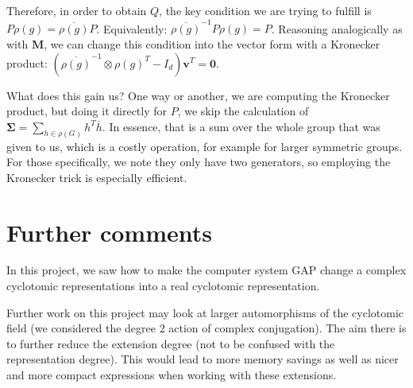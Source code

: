 \documentclass[11pt]{article}
\begin{document}
Therefore, in order to obtain $Q$, the key condition we are trying to
fulfill is $P\rho(g) = \overline{\rho(g)}P$. Equivalently:
$\overline{\rho(g)}^{-1}P\rho(g) = P$. Reasoning analogically as with $\mathbf{M}$,
we can change this condition into the vector form with a Kronecker product:
$\left(\overline{\rho(g)}^{-1} \otimes \rho(g)^T - I_d\right)\mathbf{v}^T = \mathbf{0}$.

What does this gain us? One way or another, we are computing the Kronecker product,
but doing it directly for $P$, we skip the calculation of
$\mathbf{\Sigma} = \sum_{h \in \rho(G)} h^T\overline{h}$. In essence, that is a
sum over the whole group that was given to us, which is a costly operation,
for example for larger symmetric groups. For those specifically, we note they only
have two generators, so employing the Kronecker trick is especially efficient.

\newpage

\section{Further comments} \label{sec:end}

In this project, we saw how to make the computer system GAP change a complex
cyclotomic representations into a real cyclotomic representation.

Further work on this project may look at larger automorphisms of the cyclotomic
field (we considered the degree $2$ action of complex conjugation). The aim there
is to further reduce the extension degree (not to be confused with the
representation degree). This would lead to more memory savings as well as nicer
and more compact expressions when working with these extensions.
\end{document}
